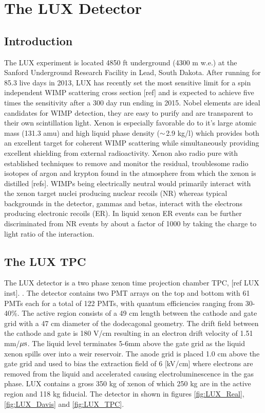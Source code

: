 

\renewcommand{\thechapter}{2}

\chapter{The LUX Detector}

\section{Introduction}

The LUX experiment is located 4850 ft underground (4300 m w.e.) at the Sanford Underground Research Facility in Lead, South Dakota. After running for 85.3 live days in 2013, LUX has recently set the most sensitive limit for a spin independent WIMP scattering cross section [ref] and is expected to achieve five times the sensitivity after a 300 day run ending in 2015. Nobel elements are ideal candidates for WIMP detection, they are easy to purify and are transparent to their own scintillation light. Xenon is especially favorable do to it's  large atomic mass (131.3 amu) and high liquid phase density ($\rm \sim$2.9 kg/l) which provides both an excellent target for coherent WIMP scattering while simultaneously providing excellent shielding from external radioactivity. Xenon also radio pure with established techniques to remove and monitor the residual, troublesome radio isotopes of argon and krypton found in the atmosphere from which the xenon is distilled [refs]. 
WIMPs being electrically neutral would primarily interact with the xenon target nuclei producing nuclear recoils (NR) whereas typical backgrounds in the detector, gammas and betas, interact with the electrons producing electronic recoils (ER). In liquid xenon ER events can be further discriminated from NR events by about a factor of 1000 by taking the charge to light ratio of the interaction.



\section{The LUX TPC}

The LUX detector is a two phase xenon time projection chamber TPC,  [ref LUX inst]. . The detector contains two PMT arrays on the top and bottom with 61 PMTs each for a total of 122 PMTs, with quantum efficiencies ranging from 30-40\%. The active region consists of a 49 cm length between the cathode and gate grid with a 47 cm diameter of the dodecagonal geometry. The drift field between the cathode and gate is 180 V/cm resulting in an electron drift velocity of 1.51 mm/$\rm \mu s$. The liquid level terminates 5-6mm above the gate grid as the liquid xenon spills over into a weir reservoir. The anode grid is placed 1.0 cm above the gate grid and used to bias the extraction field of 6 [kV/cm] where electrons are removed from the liquid and accelerated causing electroluminescence in the gas phase.  LUX contains a gross 350 kg of xenon of which 250 kg are in the active region and 118 kg fiducial.  The detector in shown in figures \ref{fig:LUX_Real}, \ref{fig:LUX_Davis} and \ref{fig:LUX_TPC}.

